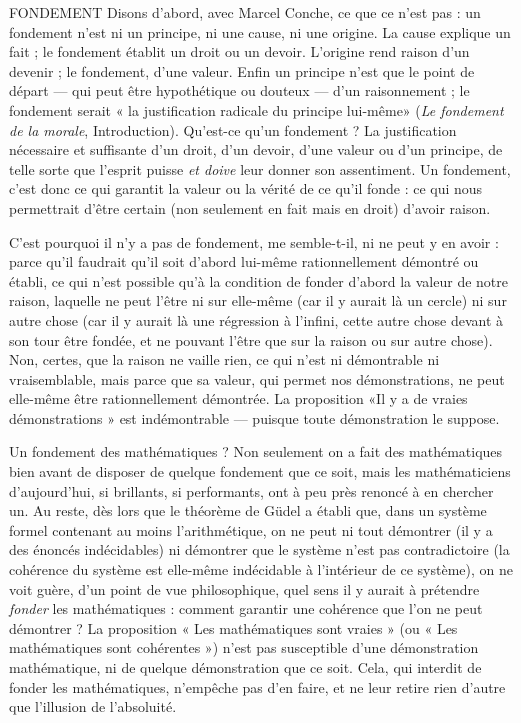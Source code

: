 FONDEMENT Disons d’abord, avec Marcel Conche, ce que ce n’est pas :
un fondement n’est ni un principe, ni une cause, ni une origine.
La cause explique un fait ; le fondement établit un droit ou un devoir.
L'origine rend raison d’un devenir ; le fondement, d’une valeur. Enfin un principe
n’est que le point de départ — qui peut être hypothétique ou douteux —
d’un raisonnement ; le fondement serait « la justification radicale du principe
lui-même» ({\it Le fondement de la morale}, Introduction). Qu'est-ce qu’un
fondement ? La justification nécessaire et suffisante d’un droit, d’un devoir,
d’une valeur ou d’un principe, de telle sorte que l'esprit puisse {\it et doive} leur
donner son assentiment. Un fondement, c’est donc ce qui garantit la valeur ou
la vérité de ce qu’il fonde : ce qui nous permettrait d’être certain (non seulement
en fait mais en droit) d’avoir raison.

C’est pourquoi il n’y a pas de fondement, me semble-t-il, ni ne peut y en
avoir : parce qu’il faudrait qu’il soit d’abord lui-même rationnellement
démontré ou établi, ce qui n’est possible qu’à la condition de fonder d’abord la
valeur de notre raison, laquelle ne peut l'être ni sur elle-même (car il y aurait là
un cercle) ni sur autre chose (car il y aurait là une régression à l’infini, cette
autre chose devant à son tour être fondée, et ne pouvant l’être que sur la raison
ou sur autre chose). Non, certes, que la raison ne vaille rien, ce qui n’est ni
démontrable ni vraisemblable, mais parce que sa valeur, qui permet nos
démonstrations, ne peut elle-même être rationnellement démontrée. La proposition
«Il y a de vraies démonstrations » est indémontrable — puisque toute
démonstration le suppose.

Un fondement des mathématiques ? Non seulement on a fait des mathématiques
bien avant de disposer de quelque fondement que ce soit, mais les
mathématiciens d’aujourd’hui, si brillants, si performants, ont à peu près
renoncé à en chercher un. Au reste, dès lors que le théorème de Güdel a établi
que, dans un système formel contenant au moins l’arithmétique, on ne peut ni
tout démontrer (il y a des énoncés indécidables) ni démontrer que le système
n’est pas contradictoire (la cohérence du système est elle-même indécidable à
l'intérieur de ce système), on ne voit guère, d’un point de vue philosophique,
quel sens il y aurait à prétendre {\it fonder} les mathématiques : comment garantir
une cohérence que l’on ne peut démontrer ? La proposition « Les mathématiques
sont vraies » (ou « Les mathématiques sont cohérentes ») n’est pas susceptible
d’une démonstration mathématique, ni de quelque démonstration que
ce soit. Cela, qui interdit de fonder les mathématiques, n’empêche pas d’en
faire, et ne leur retire rien d’autre que l'illusion de l’absoluité.

